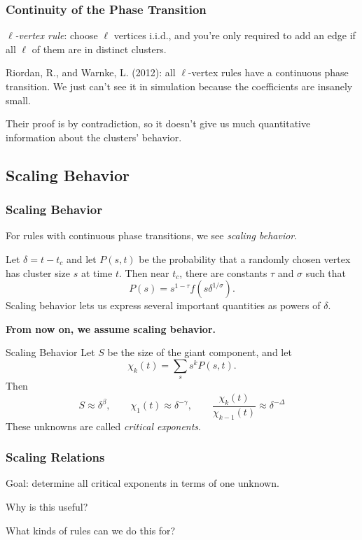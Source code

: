 \documentclass{beamer}
\begin{document}
\begin{frame}
	\frametitle{Continuity of the Phase Transition}

	\textit{$\ell$-vertex rule}: choose $\ell$ vertices i.i.d., and you're only required to add an edge if all $\ell$ of them are in distinct clusters.
	\vspace{5mm}

	Riordan, R., and Warnke, L. (2012): all $\ell$-vertex rules have a continuous phase transition. We just can't see it in simulation because the coefficients are insanely small.
	\vspace{5mm}

	\pause
	Their proof is by contradiction, so it doesn't give us much quantitative information about the clusters' behavior.
\end{frame}

\subsection{Scaling Behavior}

\begin{frame}
	\frametitle{Scaling Behavior}

	For rules with continuous phase transitions, we see \textit{scaling behavior}.
	\vspace{5mm}

	Let $\delta = t-t_c$ and let $P(s, t)$ be the probability that a randomly chosen vertex has cluster size $s$ at time $t$. Then near $t_c$, there are constants $\tau$ and $\sigma$ such that
	\[
		P(s) = s^{1-\tau}f(s \delta^{1/\sigma}).
	\] Scaling behavior lets us express several important quantities as powers of $\delta$.
	\vspace{5mm}

	\pause
	{\color{myblue}\bfseries From now on, we assume scaling behavior.}
\end{frame}

\begin{frame}{Scaling Behavior}
	Let $S$ be the size of the giant component, and let
	\[
		\chi_k(t) = \sum_s s^{k} P(s, t).
	\] Then
	\[
		S \approx \delta^{\beta}, \quad\quad
		\chi_1(t) \approx \delta^{-\gamma}, \quad\quad
		\frac{\chi_k(t)}{\chi_{k-1}(t)}  \approx \delta^{-\Delta}
	\]
	These unknowns are called \textit{critical exponents}.
\end{frame}

\begin{frame}
	\frametitle{Scaling Relations}

	Goal: determine all critical exponents in terms of one unknown.
	\vspace{5mm}

	Why is this useful?
	\vspace{5mm}

	\pause
	What kinds of rules can we do this for?
\end{frame}
\end{document}
